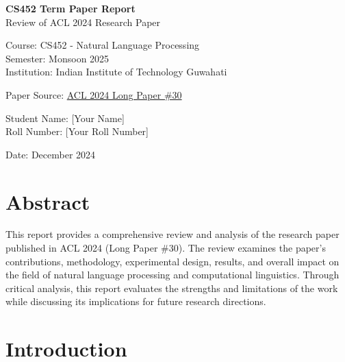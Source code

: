 \documentclass[12pt,a4paper]{article}
\begin{document}
\begin{titlepage}
    \centering
    \vspace*{2cm}
    
    {\LARGE\bfseries CS452 Term Paper Report\\}
    \vspace{0.5cm}
    {\Large Review of ACL 2024 Research Paper\\}
    \vspace{2cm}
    
    {\large Course: CS452 - Natural Language Processing\\}
    {\large Semester: Monsoon 2025\\}
    {\large Institution: Indian Institute of Technology Guwahati\\}
    \vspace{2cm}
    
    {\large Paper Source: \href{https://aclanthology.org/2024.acl-long.30/}{ACL 2024 Long Paper \#30}\\}
    \vspace{1cm}
    
    {\large Student Name: [Your Name]\\}
    {\large Roll Number: [Your Roll Number]\\}
    \vspace{2cm}
    
    {\large Date: December 2024\\}
    
    \vfill
\end{titlepage}

\tableofcontents
\newpage

\section{Abstract}
This report provides a comprehensive review and analysis of the research paper published in ACL 2024 (Long Paper \#30). The review examines the paper's contributions, methodology, experimental design, results, and overall impact on the field of natural language processing and computational linguistics. Through critical analysis, this report evaluates the strengths and limitations of the work while discussing its implications for future research directions.

\section{Introduction}
\end{document}
